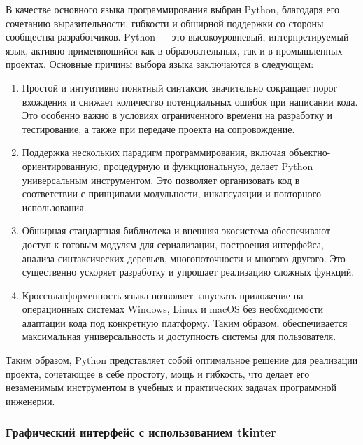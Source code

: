 В качестве основного языка программирования выбран Python, благодаря его сочетанию выразительности, гибкости и обширной поддержки со стороны сообщества разработчиков. Python — это высокоуровневый, интерпретируемый язык, активно применяющийся как в образовательных, так и в промышленных проектах. Основные причины выбора языка заключаются в следующем:
\begin{enumerate}
	\item Простой и интуитивно понятный синтаксис значительно сокращает порог вхождения и снижает количество потенциальных ошибок при написании кода. Это особенно важно в условиях ограниченного времени на разработку и тестирование, а также при передаче проекта на сопровождение.
	\item Поддержка нескольких парадигм программирования, включая объектно-ориентированную, процедурную и функциональную, делает Python универсальным инструментом. Это позволяет организовать код в соответствии с принципами модульности, инкапсуляции и повторного использования.
	\item Обширная стандартная библиотека и внешняя экосистема обеспечивают доступ к готовым модулям для сериализации, построения интерфейса, анализа синтаксических деревьев, многопоточности и многого другого. Это существенно ускоряет разработку и упрощает реализацию сложных функций.
	\item Кроссплатформенность языка позволяет запускать приложение на операционных системах Windows, Linux и macOS без необходимости адаптации кода под конкретную платформу. Таким образом, обеспечивается максимальная универсальность и доступность системы для пользователя.	
\end{enumerate}
Таким образом, Python представляет собой оптимальное решение для реализации проекта, сочетающее в себе простоту, мощь и гибкость, что делает его незаменимым инструментом в учебных и практических задачах программной инженерии.

\subsubsection{Графический интерфейс с использованием tkinter}

